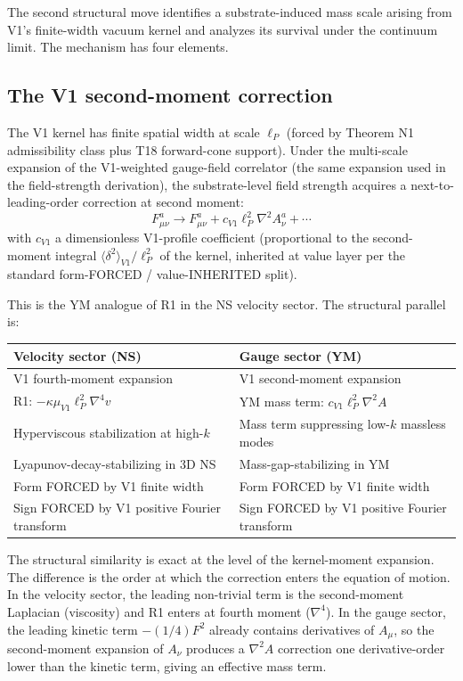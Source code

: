 \documentclass[11pt,a4paper]{article}
\begin{document}
The second structural move identifies a substrate-induced mass scale arising from V1's finite-width vacuum kernel and analyzes its survival under the continuum limit. The mechanism has four elements.

\subsection{The V1 second-moment correction}

The V1 kernel has finite spatial width at scale $\ell_P$ (forced by Theorem N1 admissibility class plus T18 forward-cone support). Under the multi-scale expansion of the V1-weighted gauge-field correlator (the same expansion used in the field-strength derivation), the substrate-level field strength acquires a next-to-leading-order correction at second moment:
\[
F_{\mu\nu}^a \to F_{\mu\nu}^a + c_{V1} \ell_P^{2} \nabla^{2} A_\nu^a + \cdots
\]
with $c_{V1}$ a dimensionless V1-profile coefficient (proportional to the second-moment integral $\langle \delta^{2}\rangle_{V1} / \ell_P^{2}$ of the kernel, inherited at value layer per the standard form-FORCED / value-INHERITED split).

This is the YM analogue of R1 in the NS velocity sector. The structural parallel is:

\begin{center}
\begin{tabular}{ll}
\toprule
\textbf{Velocity sector (NS)} & \textbf{Gauge sector (YM)} \\
\midrule
V1 fourth-moment expansion & V1 second-moment expansion \\
R1: $-\kappa \mu_{V1} \ell_P^{2} \nabla^{4} v$ & YM mass term: $c_{V1} \ell_P^{2} \nabla^{2} A$ \\
Hyperviscous stabilization at high-$k$ & Mass term suppressing low-$k$ massless modes \\
Lyapunov-decay-stabilizing in 3D NS & Mass-gap-stabilizing in YM \\
Form FORCED by V1 finite width & Form FORCED by V1 finite width \\
Sign FORCED by V1 positive Fourier transform & Sign FORCED by V1 positive Fourier transform \\
\bottomrule
\end{tabular}
\end{center}

The structural similarity is exact at the level of the kernel-moment expansion. The difference is the order at which the correction enters the equation of motion. In the velocity sector, the leading non-trivial term is the second-moment Laplacian (viscosity) and R1 enters at fourth moment ($\nabla^{4}$). In the gauge sector, the leading kinetic term $-(1/4)F^{2}$ already contains derivatives of $A_\mu$, so the second-moment expansion of $A_\nu$ produces a $\nabla^{2}A$ correction one derivative-order lower than the kinetic term, giving an effective mass term.
\end{document}
